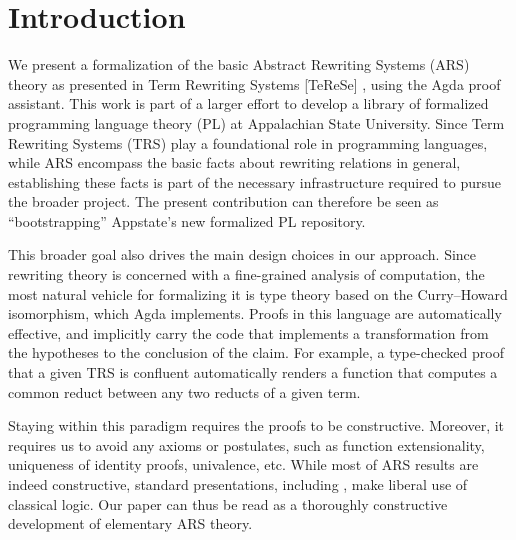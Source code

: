 \section{Introduction}
\label{sec:Introduction}

%


We present a formalization of the basic Abstract Rewriting Systems (ARS) theory as presented in Term Rewriting Systems [TeReSe]
 \cite{Terese}, using the Agda proof assistant.
This work is part of a larger effort to develop a library of formalized programming language theory (PL)
at Appalachian State University.
Since Term Rewriting Systems (TRS) play a foundational role in programming languages,
while ARS encompass the basic facts about rewriting relations in general,
establishing these facts is part of the necessary infrastructure required to
pursue the broader project.  The present contribution can therefore be seen as
``bootstrapping'' Appstate's new formalized PL repository.

This broader goal also drives the main design choices in our approach.
Since rewriting theory is concerned with a fine-grained analysis of computation,
the most natural vehicle for formalizing it is type theory based on the
Curry--Howard isomorphism, which Agda implements.  Proofs in this language
are automatically effective, and implicitly carry the code that implements
a transformation from the hypotheses to the conclusion of the claim.  For example,
a type-checked proof that a given TRS is confluent automatically renders a function that
computes a common reduct between any two reducts of a given term.

Staying within this paradigm requires the proofs to be constructive.
Moreover, it requires us to avoid any axioms or postulates, such as function
extensionality, uniqueness of identity proofs, univalence, etc.
While most of ARS results are indeed constructive, standard presentations,
 including \cite{Terese}, make liberal use of classical logic.
Our paper can thus be read as a thoroughly constructive
development of elementary ARS theory.

